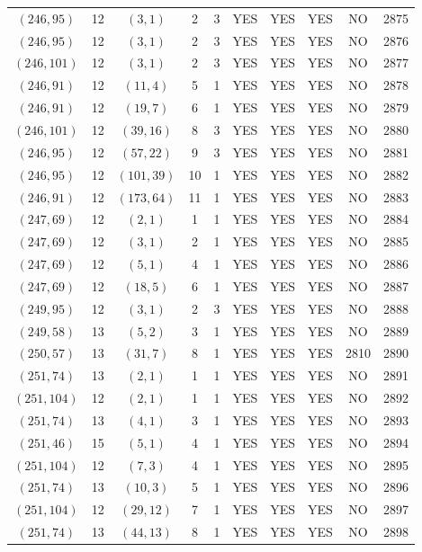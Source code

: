 \begin{longtable}{|c|c|c|c|c|c|c|c|c|c|}
$(246, 95)$ & 12 & $(3, 1)$ & 2 & 3 & YES & YES & YES & NO & 2875\\
$(246, 95)$ & 12 & $(3, 1)$ & 2 & 3 & YES & YES & YES & NO & 2876\\
$(246, 101)$ & 12 & $(3, 1)$ & 2 & 3 & YES & YES & YES & NO & 2877\\
$(246, 91)$ & 12 & $(11, 4)$ & 5 & 1 & YES & YES & YES & NO & 2878\\
$(246, 91)$ & 12 & $(19, 7)$ & 6 & 1 & YES & YES & YES & NO & 2879\\
$(246, 101)$ & 12 & $(39, 16)$ & 8 & 3 & YES & YES & YES & NO & 2880\\
$(246, 95)$ & 12 & $(57, 22)$ & 9 & 3 & YES & YES & YES & NO & 2881\\
$(246, 95)$ & 12 & $(101, 39)$ & 10 & 1 & YES & YES & YES & NO & 2882\\
$(246, 91)$ & 12 & $(173, 64)$ & 11 & 1 & YES & YES & YES & NO & 2883\\
$(247, 69)$ & 12 & $(2, 1)$ & 1 & 1 & YES & YES & YES & NO & 2884\\
$(247, 69)$ & 12 & $(3, 1)$ & 2 & 1 & YES & YES & YES & NO & 2885\\
$(247, 69)$ & 12 & $(5, 1)$ & 4 & 1 & YES & YES & YES & NO & 2886\\
$(247, 69)$ & 12 & $(18, 5)$ & 6 & 1 & YES & YES & YES & NO & 2887\\
$(249, 95)$ & 12 & $(3, 1)$ & 2 & 3 & YES & YES & YES & NO & 2888\\
$(249, 58)$ & 13 & $(5, 2)$ & 3 & 1 & YES & YES & YES & NO & 2889\\
$(250, 57)$ & 13 & $(31, 7)$ & 8 & 1 & YES & YES & YES & 2810 & 2890\\
$(251, 74)$ & 13 & $(2, 1)$ & 1 & 1 & YES & YES & YES & NO & 2891\\
$(251, 104)$ & 12 & $(2, 1)$ & 1 & 1 & YES & YES & YES & NO & 2892\\
$(251, 74)$ & 13 & $(4, 1)$ & 3 & 1 & YES & YES & YES & NO & 2893\\
$(251, 46)$ & 15 & $(5, 1)$ & 4 & 1 & YES & YES & YES & NO & 2894\\
$(251, 104)$ & 12 & $(7, 3)$ & 4 & 1 & YES & YES & YES & NO & 2895\\
$(251, 74)$ & 13 & $(10, 3)$ & 5 & 1 & YES & YES & YES & NO & 2896\\
$(251, 104)$ & 12 & $(29, 12)$ & 7 & 1 & YES & YES & YES & NO & 2897\\
$(251, 74)$ & 13 & $(44, 13)$ & 8 & 1 & YES & YES & YES & NO & 2898\\

\end{longtable}
